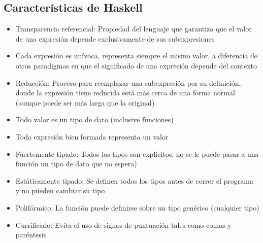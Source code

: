 \documentclass[a4paper,10pt]{article}
\begin{document}
\subsection{Características de Haskell}
	\begin{itemize}
		\item Transparencia referencial: Propiedad del lenguaje que garantiza que el valor de una expresión depende exclusivamente de sus subexpresiones
		\item Cada expresión es unívoca, representa siempre el mismo valor, a diferencia de otros paradigmas en que el significado de una expresión depende del contexto
		\item Reducción: Proceso para reemplazar una subexpresión por su definición, donde la expresión tiene reducida está más cerca de una forma normal (aunque puede ser más larga que la original)
		\item Todo valor es un tipo de dato (inclusive funciones)
		\item Toda expresión bien formada representa un valor
		\item Fuertemente tipado: Todos los tipos son explicitos, no se le puede pasar a una función un tipo de dato que no espera)
		\item Estáticamente tipado: Se definen todos los tipos antes de correr el programa y no pueden cambiar su tipo
		\item Polifórmico: La función puede definirse sobre un tipo genérico (cualquier tipo)
		\item Currificado: Evita el uso de signos de puntuación tales como comas y paréntesis  
	\end{itemize}
\end{document}
